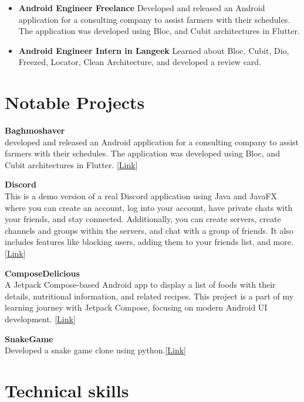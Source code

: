 \documentclass[a4paper,10pt]{article} %
\begin{document}
\begin{itemize}
    \item \textbf{Android Engineer Freelance } Developed and released an Android application for a consulting company to assist farmers with their schedules. The application was developed using Bloc, and Cubit architectures in Flutter. 
    \item \textbf{Android Engineer Intern in Langeek} Learned about Bloc, Cubit, Dio, Freezed, Locator, Clean Architecture, and developed a review card.
\end{itemize}


\section{Notable Projects}  

\begin{small}

\textbf{Baghmoshaver}\\
developed and released an Android application for a consulting company to assist farmers with their schedules. The application was developed using Bloc, and Cubit architectures in Flutter. [\href{https://cafebazaar.ir/app/com.example.bagh_moshaver}{Link}]
\end{small}

\textbf{Discord}\\
This is a demo version of a real Discord application using Java and JavaFX where you can create an account, log into
your account, have private chats with your friends, and stay connected. Additionally, you can
create servers, create channels and groups within the servers, and chat with a group of friends. It also
includes features like blocking users, adding them to your friends list, and more.
[\href{https://github.com/Aliamrol/Discord}{Link}]

\textbf{ComposeDelicious}\\
A Jetpack Compose-based Android app to display a list of foods with their details, nutritional information, and related recipes. This project is a part of my learning journey with Jetpack Compose, focusing on modern Android UI development.
[\href{https://github.com/Aliamrol/ComposeDelicious}{Link}]

\textbf{SnakeGame}\\
Developed a snake game clone using python.[\href{https://github.com/Aliamrol/SnakeGame}{Link}]


\section{Technical skills} 
\end{document}
